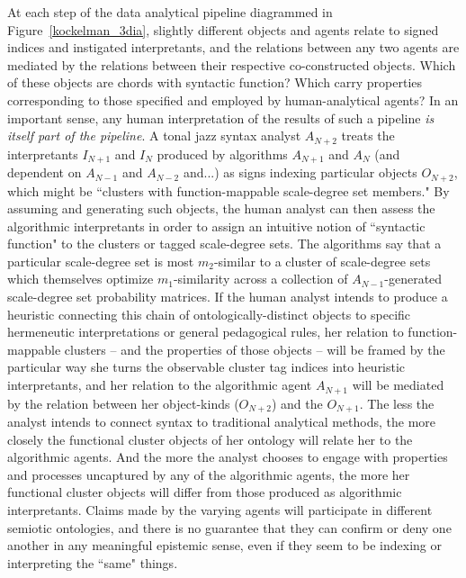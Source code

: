 At each step of the data analytical pipeline diagrammed in Figure~\ref{kockelman_3dia}, slightly different objects and agents relate to signed indices and instigated interpretants, and the relations between any two agents are mediated by the relations between their respective co-constructed objects.  Which of these objects are chords with syntactic function?  Which carry properties corresponding to those specified and employed by human-analytical agents?  In an important sense, any human interpretation of the results of such a pipeline \emph{is itself part of the pipeline}.  A tonal jazz syntax analyst $A_{N+2}$ treats the interpretants $I_{N+1}$ and $I_N$ produced by algorithms $A_{N+1}$ and $A_{N}$ (and dependent on $A_{N-1}$ and $A_{N-2}$ and...) as signs indexing particular objects $O_{N+2}$, which might be ``clusters with function-mappable scale-degree set members."  By assuming and generating such objects, the human analyst can then assess the algorithmic interpretants in order to assign an intuitive notion of ``syntactic function" to the clusters or tagged scale-degree sets.  The algorithms say that a particular scale-degree set is most $m_2$-similar to a cluster of scale-degree sets which themselves optimize $m_1$-similarity across a collection of $A_{N-1}$-generated scale-degree set probability matrices.  If the human analyst intends to produce a heuristic connecting this chain of ontologically-distinct objects to specific hermeneutic interpretations or general pedagogical rules, her relation to function-mappable clusters -- and the properties of those objects -- will be framed by the particular way she turns the observable cluster tag indices into heuristic interpretants, and her relation to the algorithmic agent $A_{N+1}$ will be mediated by the relation between her object-kinds ($O_{N+2}$) and the $O_{N+1}$.  The less the analyst intends to connect syntax to traditional analytical methods, the more closely the functional cluster objects of her ontology will relate her to the algorithmic agents.  And the more the analyst chooses to engage with properties and processes uncaptured by any of the algorithmic agents, the more her functional cluster objects will differ from those produced as algorithmic interpretants.  Claims made by the varying agents will participate in different semiotic ontologies, and there is no guarantee that they can confirm or deny one another in any meaningful epistemic sense, even if they seem to be indexing or interpreting the ``same" things.

